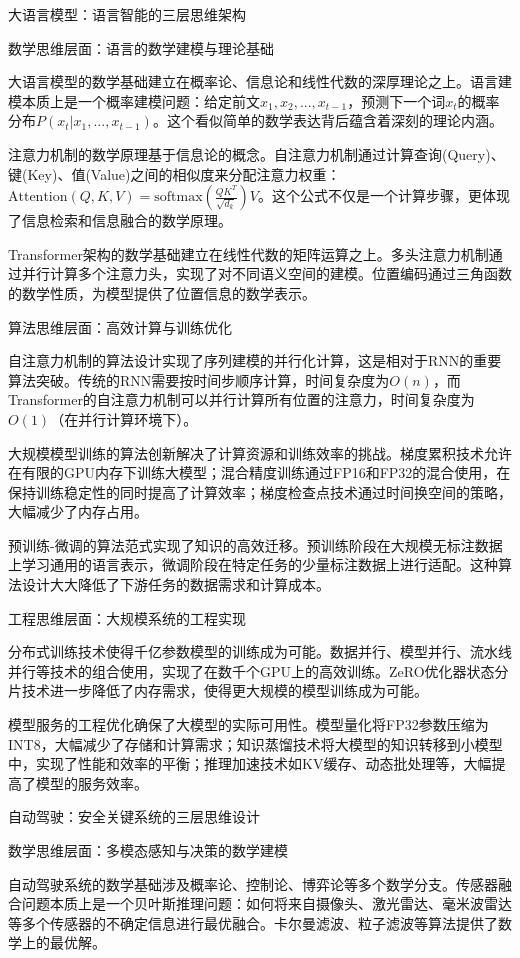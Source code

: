 大语言模型：语言智能的三层思维架构

数学思维层面：语言的数学建模与理论基础

大语言模型的数学基础建立在概率论、信息论和线性代数的深厚理论之上。语言建模本质上是一个概率建模问题：给定前文$x_1, x_2, ..., x_{t-1}$，预测下一个词$x_t$的概率分布$P(x_t|x_1, ..., x_{t-1})$。这个看似简单的数学表达背后蕴含着深刻的理论内涵。

注意力机制的数学原理基于信息论的概念。自注意力机制通过计算查询(Query)、键(Key)、值(Value)之间的相似度来分配注意力权重：$\text{Attention}(Q,K,V) = \text{softmax}(\frac{QK^T}{\sqrt{d_k}})V$。这个公式不仅是一个计算步骤，更体现了信息检索和信息融合的数学原理。

Transformer架构的数学基础建立在线性代数的矩阵运算之上。多头注意力机制通过并行计算多个注意力头，实现了对不同语义空间的建模。位置编码通过三角函数的数学性质，为模型提供了位置信息的数学表示。

算法思维层面：高效计算与训练优化

自注意力机制的算法设计实现了序列建模的并行化计算，这是相对于RNN的重要算法突破。传统的RNN需要按时间步顺序计算，时间复杂度为$O(n)$，而Transformer的自注意力机制可以并行计算所有位置的注意力，时间复杂度为$O(1)$（在并行计算环境下）。

大规模模型训练的算法创新解决了计算资源和训练效率的挑战。梯度累积技术允许在有限的GPU内存下训练大模型；混合精度训练通过FP16和FP32的混合使用，在保持训练稳定性的同时提高了计算效率；梯度检查点技术通过时间换空间的策略，大幅减少了内存占用。

预训练-微调的算法范式实现了知识的高效迁移。预训练阶段在大规模无标注数据上学习通用的语言表示，微调阶段在特定任务的少量标注数据上进行适配。这种算法设计大大降低了下游任务的数据需求和计算成本。

工程思维层面：大规模系统的工程实现

分布式训练技术使得千亿参数模型的训练成为可能。数据并行、模型并行、流水线并行等技术的组合使用，实现了在数千个GPU上的高效训练。ZeRO优化器状态分片技术进一步降低了内存需求，使得更大规模的模型训练成为可能。

模型服务的工程优化确保了大模型的实际可用性。模型量化将FP32参数压缩为INT8，大幅减少了存储和计算需求；知识蒸馏技术将大模型的知识转移到小模型中，实现了性能和效率的平衡；推理加速技术如KV缓存、动态批处理等，大幅提高了模型的服务效率。

自动驾驶：安全关键系统的三层思维设计

数学思维层面：多模态感知与决策的数学建模

自动驾驶系统的数学基础涉及概率论、控制论、博弈论等多个数学分支。传感器融合问题本质上是一个贝叶斯推理问题：如何将来自摄像头、激光雷达、毫米波雷达等多个传感器的不确定信息进行最优融合。卡尔曼滤波、粒子滤波等算法提供了数学上的最优解。

